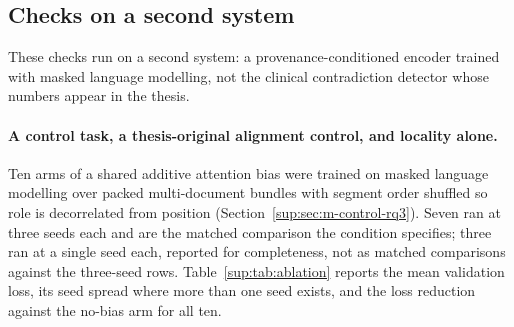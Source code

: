 \subsection{Checks on a second system}

These checks run on a second system: a provenance-conditioned encoder trained with masked
language modelling, not the clinical contradiction detector whose numbers appear in the thesis.

\paragraph{A control task, a thesis-original alignment control, and locality alone.} Ten arms of a
shared additive attention bias were trained on masked language modelling over packed multi-document
bundles with segment order shuffled so role is decorrelated from position
(Section~\ref{sup:sec:m-control-rq3}). Seven ran at three seeds each and are the matched comparison the
condition specifies; three ran at a single seed each, reported for completeness, not as
matched comparisons against the three-seed rows. Table~\ref{sup:tab:ablation} reports the mean
validation loss, its seed spread where more than one seed exists, and the loss reduction against the
no-bias arm for all ten.


